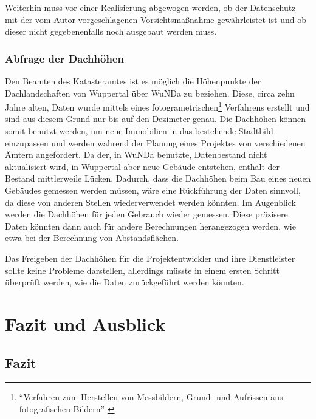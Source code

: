Weiterhin muss vor einer Realisierung abgewogen werden, ob der Datenschutz mit der vom Autor vorgeschlagenen Vorsichtsmaßnahme gewährleistet ist und ob dieser nicht gegebenenfalls noch ausgebaut werden muss.

\subsection{Abfrage der Dachhöhen}
\label{subsec:dachhoehen}
Den Beamten des Katasteramtes ist es möglich die Höhenpunkte der Dachlandschaften von Wuppertal über \ac{WuNDa} zu beziehen.
Diese, circa zehn Jahre alten, Daten wurde mittels eines fotogrametrischen\footnote{\enquote{Verfahren zum Herstellen von Messbildern, Grund- und Aufrissen aus fotografischen Bildern} \autocite{duden-foto}}
Verfahrens erstellt und sind aus diesem Grund nur bis auf den Dezimeter genau.
Die Dachhöhen können somit benutzt werden, um neue Immobilien in das bestehende Stadtbild einzupassen und werden während der Planung eines Projektes von verschiedenen Ämtern angefordert.
Da der, in \ac{WuNDa} benutzte, Datenbestand nicht aktualisiert wird, in Wuppertal aber neue Gebäude entstehen, enthält der Bestand mittlerweile Lücken.
Dadurch, dass die Dachhöhen beim Bau eines neuen Gebäudes gemessen werden müssen, wäre eine Rückführung der Daten sinnvoll, da diese von anderen Stellen wiederverwendet werden könnten.
Im Augenblick werden die Dachhöhen für jeden Gebrauch wieder gemessen.
Diese präzisere Daten könnten dann auch für andere Berechnungen herangezogen werden, wie etwa bei der Berechnung von Abstandsflächen.

Das Freigeben der Dachhöhen für die Projektentwickler und ihre Dienstleister sollte keine Probleme darstellen, allerdings müsste in einem ersten Schritt überprüft werden, wie die Daten zurückgeführt werden könnten.

\chapter{Fazit und Ausblick}

\section{Fazit}

